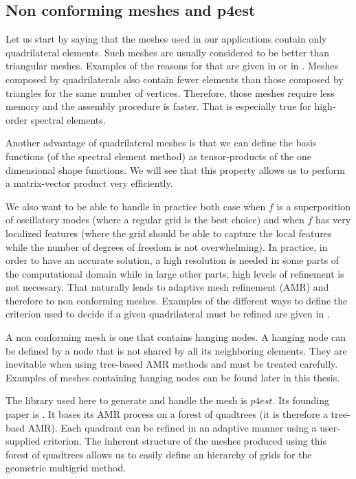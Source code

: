 \subsection*{Non conforming meshes and p4est}

Let us start by saying that the meshes used in our applications contain only quadrilateral elements. Such meshes are usually considered to be better than triangular meshes. Examples of the reasons for that are given in \cite{hexes} or in \cite{semTri}. Meshes composed by quadrilaterals also contain fewer elements than those composed by triangles for the same number of vertices. Therefore, those meshes require less memory and the assembly procedure is faster. That is especially true for high-order spectral elements.

Another advantage of quadrilateral meshes is that we can define the basis functions (of the spectral element method) as tensor-products of the one dimensional shape functions. We will see that this property allows us to perform a matrix-vector product very efficiently.  

We also want to be able to handle in practice both case when $f$ is a superposition of oscillatory modes (where a regular grid is the best choice) and when $f$ has very localized features (where the grid should be able to capture the local features while the number of degrees of freedom is not overwhelming). In practice, in order to have an accurate solution, a high resolution is needed in some parts of the computational domain while in large other parts, high levels of refinement is not necessary.  That naturally leads to adaptive mesh refinement (AMR) and therefore to non conforming meshes. Examples of the different ways to define the criterion used to decide if a given quadrilateral must be refined are given in \cite{refine}.

A non conforming mesh is one that contains hanging nodes. A hanging node can be defined by a node that is not shared by all its neighboring elements. They are inevitable when using tree-based AMR methods and must be treated carefully. Examples of meshes containing hanging nodes can be found later in this thesis. 

The library used here to generate and handle the mesh is $p4est$. Its founding paper is \cite{p4est}. It bases its AMR process on a forest of quadtrees (it is therefore a tree-basd AMR). Each quadrant can be refined in an adaptive manner using a user-supplied criterion. The inherent structure of the meshes produced using this forest of quadtrees allows us to easily define an hierarchy of grids for the geometric multigrid method.  


